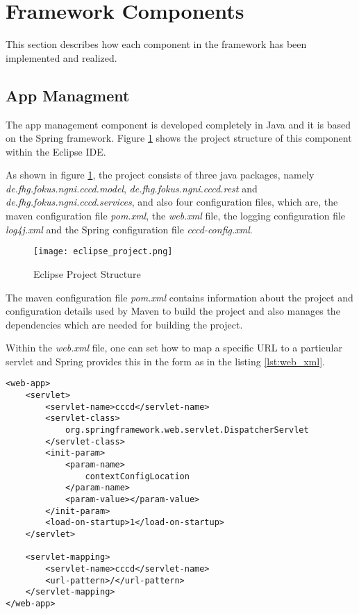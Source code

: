 \section{Framework Components\label{sec:impl_used_op_sr}}
This section describes how each component in the framework has been implemented and realized.

\subsection{App Managment\label{sec:impl_app_man}}
The app management component is developed completely in Java and it is based on the Spring framework. Figure \ref{fig:eclipse_project} shows the project structure of this component within the Eclipse IDE.

As shown in figure \ref{fig:eclipse_project}, the project consists of three java packages, namely \textit{de.fhg.fokus.ngni.cccd.model}, \textit{de.fhg.fokus.ngni.cccd.rest} and \textit{de.fhg.fokus.ngni.cccd.services}, and also four configuration files, which are, the maven configuration file \textit{pom.xml}, the \textit{web.xml} file, the logging configuration file \textit{log4j.xml} and the Spring configuration file \textit{cccd-config.xml}.

\begin{figure}[htb]
  \centering
  \texttt{[image: eclipse\_project.png]}\\
  \caption{Eclipse Project Structure}
  \label{fig:eclipse_project}
\end{figure}

\pagebreak

The maven configuration file \textit{pom.xml} contains information about the project and configuration details used by Maven to build the project and also manages the dependencies which are needed for building the project.

Within the \textit{web.xml} file, one can set how to map a specific \ac{URL} to a particular servlet and Spring provides this in the form as in the listing \ref{lst:web_xml}.

\begin{code}
\begin{verbatim}
<web-app>
	<servlet>
		<servlet-name>cccd</servlet-name>
		<servlet-class>
			org.springframework.web.servlet.DispatcherServlet
		</servlet-class>
		<init-param>
			<param-name>
				contextConfigLocation
			</param-name>
			<param-value></param-value>
		</init-param>
		<load-on-startup>1</load-on-startup>
	</servlet>

	<servlet-mapping>
		<servlet-name>cccd</servlet-name>
		<url-pattern>/</url-pattern>
	</servlet-mapping>
</web-app>
\end{verbatim}
\caption{Excerpt from the web.xml configuration file}
\label{lst:web_xml}
\end{code}

